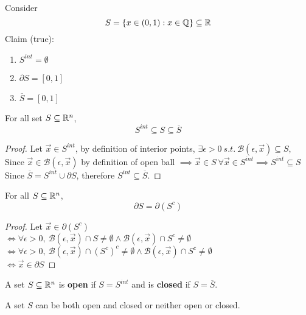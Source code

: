 \documentclass[]{article}
\newcommand{\ball}[2]{\mathcal{B}({#1}, {#2})}
\begin{document}
	\begin{example}
		Consider 
		\[
			S = \{x \in (0, 1): x \in \mathbb{Q}\} \subseteq \mathbb{R}
		\]
		Claim (true):
		\begin{enumerate}
			\item $S^{int} = \emptyset$
			\item $\partial S = [0,1]$
			\item $\overline{S} = [0,1]$
		\end{enumerate}
	\end{example}
	
	\begin{theorem}
		For all set $S \subseteq \mathbb{R}^n$, 
		\[
			S^{int} \subseteq S \subseteq \overline{S}
		\]
	\end{theorem}
	\begin{proof}
		Let $\vec{x} \in S^{int}$, by definition of interior points, $\exists \epsilon > 0\ s.t.\ \ball{\epsilon}{\vec{x}} \subseteq S$, \\
		Since $\vec{x} \in \ball{\epsilon}{\vec{x}}$ by definition of open ball $\implies \vec{x} \in S\ \forall \vec{x} \in S^{int} \implies S^{int} \subseteq S$\\
		Since $\overline{S} = S^{int} \cup \partial S$, therefore $S^{int} \subseteq \overline{S}$. 
	\end{proof}
	
	\begin{theorem}
		For all $S \subseteq \mathbb{R}^n$, 
		\[
			\partial S = \partial (S^c)
		\]
	\end{theorem}
	
	\begin{proof}
		Let $\vec{x} \in \partial (S^c)$ \\
		$\iff \forall \epsilon > 0,\ \ball{\epsilon}{\vec{x}} \cap S \neq \emptyset \land \ball{\epsilon}{\vec{x}} \cap S^c \neq \emptyset$ \\
		$\iff \forall \epsilon > 0, \ \ball{\epsilon}{\vec{x}} \cap (S^c)^c \neq \emptyset \land \ball{\epsilon}{\vec{x}} \cap S^c \neq \emptyset$ \\
		$\iff \vec{x} \in \partial S$
	\end{proof}
	
	\begin{definition}
		A set $S \subseteq \mathbb{R}^n$ is \textbf{open} if $S = S^{int}$ and is \textbf{closed} if $S = \overline{S}$.
	\end{definition}
	
	\begin{remark}
		A set $S$ can be both open and closed or neither open or closed.
	\end{remark}
	
\end{document}
